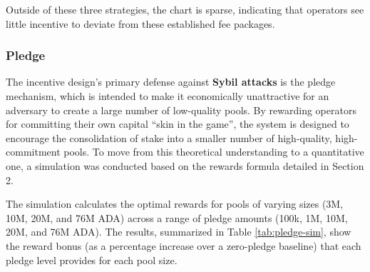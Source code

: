 \documentclass[11pt, letterpaper]{article}
\begin{document}
Outside of these three strategies, the chart is sparse, indicating that operators see little incentive to
deviate from these established fee packages.

\subsubsection{Pledge}

The incentive design's primary defense against \textbf{Sybil attacks} is the
pledge mechanism, which is intended to make it economically unattractive for an
adversary to create a large number of low-quality pools. By rewarding operators
for committing their own capital ``skin in the game'', the system is designed
to encourage the consolidation of stake into a smaller number of high-quality,
high-commitment pools. To move from this theoretical understanding to a
quantitative one, a simulation was conducted based on the rewards formula
detailed in Section 2.

The simulation calculates the optimal rewards for pools of varying sizes (3M,
10M, 20M, and 76M ADA) across a range of pledge amounts (100k, 1M, 10M, 20M,
and 76M ADA). The results, summarized in Table \ref{tab:pledge-sim}, show the
reward bonus (as a percentage increase over a zero-pledge baseline) that each
pledge level provides for each pool size.

\begin{table}[H]
	\centering
	\caption{Simulated pledge reward bonus ($\Delta$Rewards \%) by pool size and pledge amount. The table shows
		the calculated optimal rewards and the percentage increase over a zero-pledge baseline.}
	\label{tab:pledge-sim}
\end{table}
\end{document}

